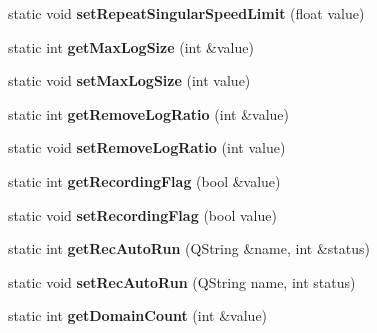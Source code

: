\begin{DoxyCompactItemize}
\item 
\hypertarget{classAppConf_aad445a38b26fd3f3465f54a2f18f651e}{static void {\bfseries set\-Repeat\-Singular\-Speed\-Limit} (float value)}\label{classAppConf_aad445a38b26fd3f3465f54a2f18f651e}

\item 
\hypertarget{classAppConf_a7887ba24ee5178fc0ce5a3df40f7a239}{static int {\bfseries get\-Max\-Log\-Size} (int \&value)}\label{classAppConf_a7887ba24ee5178fc0ce5a3df40f7a239}

\item 
\hypertarget{classAppConf_afeea6292ee18f86831d45f8c38d6d69f}{static void {\bfseries set\-Max\-Log\-Size} (int value)}\label{classAppConf_afeea6292ee18f86831d45f8c38d6d69f}

\item 
\hypertarget{classAppConf_a0c4b202c10c0b2822d044587b1ebed03}{static int {\bfseries get\-Remove\-Log\-Ratio} (int \&value)}\label{classAppConf_a0c4b202c10c0b2822d044587b1ebed03}

\item 
\hypertarget{classAppConf_a50310bded2f7401971709d2c3b08c988}{static void {\bfseries set\-Remove\-Log\-Ratio} (int value)}\label{classAppConf_a50310bded2f7401971709d2c3b08c988}

\item 
\hypertarget{classAppConf_a5229a12cacc977ead4264132950b01fb}{static int {\bfseries get\-Recording\-Flag} (bool \&value)}\label{classAppConf_a5229a12cacc977ead4264132950b01fb}

\item 
\hypertarget{classAppConf_af21636c6095937fc0b361fa1a43a6dda}{static void {\bfseries set\-Recording\-Flag} (bool value)}\label{classAppConf_af21636c6095937fc0b361fa1a43a6dda}

\item 
\hypertarget{classAppConf_a5d7a36f2dfbacaf6501078077cc2ced7}{static int {\bfseries get\-Rec\-Auto\-Run} (Q\-String \&name, int \&status)}\label{classAppConf_a5d7a36f2dfbacaf6501078077cc2ced7}

\item 
\hypertarget{classAppConf_ab8b8151810d74f0278e2e0fa0a806cc5}{static void {\bfseries set\-Rec\-Auto\-Run} (Q\-String name, int status)}\label{classAppConf_ab8b8151810d74f0278e2e0fa0a806cc5}

\item 
\hypertarget{classAppConf_a3164eff39e1da24bd8624f2210194f90}{static int {\bfseries get\-Domain\-Count} (int \&value)}\label{classAppConf_a3164eff39e1da24bd8624f2210194f90}


\end{DoxyCompactItemize}
